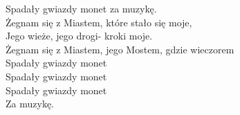 \begin{flushleft}
\hspace{0.9cm}Spadały gwiazdy monet za muzykę. \\
\vskip 3mm
\hspace{0.9cm}Żegnam się z Miastem, które stało się moje, \\
\hspace{0.9cm}Jego wieże, jego drogi- kroki moje. \\
\hspace{0.9cm}Żegnam się z Miastem, jego Mostem, gdzie wieczorem \\
\hspace{0.9cm}Spadały gwiazdy monet \tab{}\tab{}  \\
\hspace{0.9cm}Spadały gwiazdy monet \tab{}\tab{} \\
\hspace{0.9cm}Spadały gwiazdy monet \tab{}\tab{} \\
\hspace{0.9cm}Za muzykę. \tab{}\tab{} \\
\end{flushleft}
\clearpage
